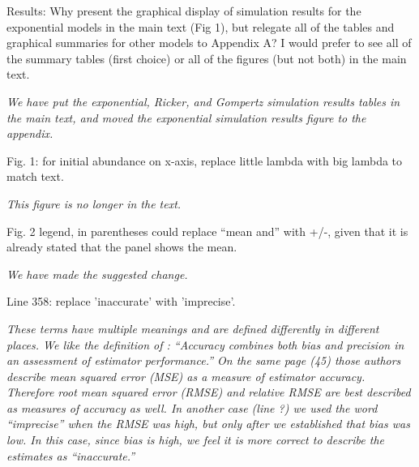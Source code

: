 \documentclass[12pt,english]{article}
\begin{document}
\begin{spacing}{1.9}
\begin{flushleft}
Results: Why present the graphical display of simulation results for the
exponential models in the main text (Fig 1), but relegate all of the tables and
graphical summaries for other models to Appendix A? I would prefer to see all of
the summary tables (first choice) or all of the figures (but not both) in the
main text.

\vspace{0.5cm}
\textit{We have put the exponential, Ricker, and Gompertz simulation results tables in the 
main text, and moved the exponential simulation results figure to the appendix.}
\vspace{0.5cm}

Fig. 1: for initial abundance on x-axis, replace little lambda with big lambda
to match text.

\vspace{0.5cm}
\textit{This figure is no longer in the text.}
\vspace{0.5cm}

Fig. 2 legend, in parentheses could replace ``mean and'' with +/-, given that it
is already stated that the panel shows the mean.

\vspace{0.5cm}
\textit{We have made the suggested change.}
\vspace{0.5cm}

Line 358: replace 'inaccurate' with 'imprecise'.

\vspace{0.5cm}
\textit{These terms have multiple meanings and are defined differently in
different places.  We like the definition of \citet{williams_etal:2002}:
``Accuracy combines both bias and precision in an assessment of estimator
performance.''  On the same page (45) those authors describe mean squared error 
(MSE) as a measure of estimator accuracy.  Therefore root mean squared error (RMSE) and
relative RMSE are best described as measures of accuracy as well.  
In another case (line ?) we used the
word ``imprecise'' when the RMSE was high, but only after we established that
bias was low.  In this case, since bias is high, we feel it is more correct to describe
the estimates as ``inaccurate.''}
\vspace{0.5cm}


\end{flushleft}
\end{spacing}
\end{document}
